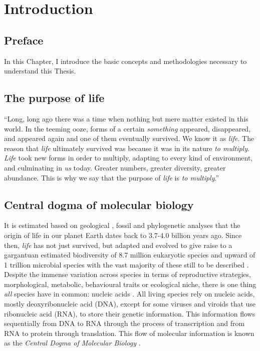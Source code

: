 \chapter{Introduction}

\section*{Preface}

In this Chapter, I introduce the basic concepts and methodologies necessary to understand this Thesis.

\section{The purpose of life}

``Long, long ago there was a time when nothing but mere matter existed in this world. In the teeming ooze, forms of a certain \textit{something} appeared, disappeared, and appeared again and one of them eventually survived. We know it as \textit{life}. The reason that \textit{life} ultimately survived was because it was in its nature \textit{to multiply}. \textit{Life} took new forms in order to multiply, adapting to every kind of environment, and culminating in \textit{us} today. Greater numbers, greater diversity, greater abundance. This is why we say that the purpose of \textit{life} is \textit{to multiply}.'' \cite{ISAYAMA_2021}

\section{Central dogma of molecular biology}

It is estimated based on geological \cite{SCHIDLOWSKI_1979_LIFE}, fossil \cite{SCHOPF_2007_LIFE} and phylogenetic \cite{BETTS_2018_LIFE} analyses that the origin of life in our planet Earth dates back to 3.7-4.0 billion years ago. Since then, \textit{life} has not just survived, but adapted and evolved to give raise to a gargantuan estimated biodiversity of 8.7 million eukaryotic species \cite{MORA_2011_SPECIES} and upward of 1 trillion microbial species \cite{HUG_2016_SPECIES, LOCEY_2016_SPECIES} with the vast majority of these still to be described \cite{COSTELLO_2013_SPECIES}. Despite the immense variation across species in terms of reproductive strategies, morphological, metabolic, behavioural traits or ecological niche, there is one thing \textit{all} species have in common: nucleic acids \cite{KOONIN_2011_LIFE}. All living species rely on nucleic acids, mostly deoxyribonucleic acid (DNA), except for some viruses \cite{KOONIN_2006_VIRUS} and viroids \cite{NAVARRO_2021_VIROIDS} that use ribonucleic acid (RNA), to store their genetic information. This information flows sequentially from DNA to RNA through the process of transcription and from RNA to protein through translation. This flow of molecular information is known as the \textit{Central Dogma of Molecular Biology} \cite{CRICK_1958_DOGMA, CRICK_1970_DOGMA}.


